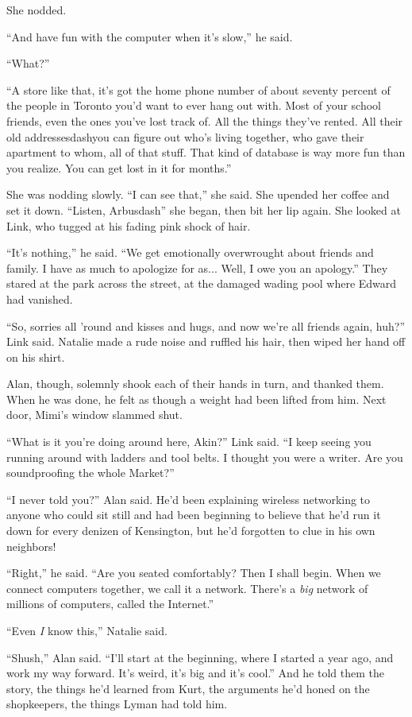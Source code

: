 She nodded.

``And have fun with the computer when it's slow,'' he said.

``What?''

``A store like that, it's got the home phone number of about seventy
percent of the people in Toronto you'd want to ever hang out with. 
Most of your school friends, even the ones you've lost track of.  All
the things they've rented.  All their old addressesdash{}you can figure
out who's living together, who gave their apartment to whom, all of
that stuff.  That kind of database is way more fun than you realize. 
You can get lost in it for months.''

She was nodding slowly.  ``I can see that,'' she said.  She upended
her coffee and set it down.  ``Listen, Arbusdash{}'' she began, then bit
her lip again.  She looked at Link, who tugged at his fading pink
shock of hair.

``It's nothing,'' he said.  ``We get emotionally overwrought about
friends and family.  I have as much to apologize for as...  Well, I
owe you an apology.'' They stared at the park across the street, at
the damaged wading pool where Edward had vanished.

``So, sorries all 'round and kisses and hugs, and now we're all
friends again, huh?'' Link said.  Natalie made a rude noise and
ruffled his hair, then wiped her hand off on his shirt.

Alan, though, solemnly shook each of their hands in turn, and thanked
them.  When he was done, he felt as though a weight had been lifted
from him.  Next door, Mimi's window slammed shut.

``What is it you're doing around here, Akin?'' Link said.  ``I keep
seeing you running around with ladders and tool belts.  I thought you
were a writer.  Are you soundproofing the whole Market?''

``I never told you?'' Alan said.  He'd been explaining wireless
networking to anyone who could sit still and had been beginning to
believe that he'd run it down for every denizen of Kensington, but
he'd forgotten to clue in his own neighbors!

``Right,'' he said.  ``Are you seated comfortably?  Then I shall
begin.  When we connect computers together, we call it a network. 
There's a \textit{big} network of millions of computers, called the
Internet.''

``Even \textit{I} know this,'' Natalie said.

``Shush,'' Alan said.  ``I'll start at the beginning, where I started
a year ago, and work my way forward.  It's weird, it's big and it's
cool.'' And he told them the story, the things he'd learned from Kurt,
the arguments he'd honed on the shopkeepers, the things Lyman had told
him.

